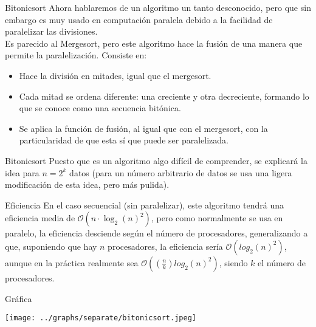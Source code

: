 \documentclass[compress]{beamer}
\begin{document}
\begin{frame}{Bitonicsort}
Ahora hablaremos de un algoritmo un tanto desconocido, pero que sin embargo es muy usado en computación paralela debido a la facilidad de paralelizar las divisiones.\\
\vspace{0.20in}
Es parecido al Mergesort, pero este algoritmo hace la fusión de una manera que permite la paralelización. Consiste en:\\
\vspace{0.20in}
	\begin{itemize}
	\item Hace la división en mitades, igual que el mergesort.
	\item Cada mitad se ordena diferente: una creciente y otra decreciente, formando lo que se conoce como una secuencia bitónica.
	\item Se aplica la función de fusión, al igual que con el mergesort, con la particularidad de que esta sí que puede ser paralelizada.
	\end{itemize}
\end{frame}

\begin{frame}{Bitonicsort}
Puesto que es un algoritmo algo difícil de comprender, se explicará la idea para $n = 2^k$ datos (para un número arbitrario de datos se usa una ligera modificación de esta idea, pero más pulida).\\
\vspace{0.20in}
	\begin{block}{Eficiencia}
	En el caso secuencial (sin paralelizar), este algoritmo tendrá una eficiencia media de $\mathcal{O}(n\cdot\log_2(n)^2)$, pero como normalmente se usa en paralelo, la eficiencia desciende según el número de procesadores, generalizando a que, suponiendo que hay $n$ procesadores, la eficiencia sería $\mathcal{O}(log_2(n)^2)$, aunque en la práctica realmente sea $\mathcal{O}((\tfrac{n}{k})log_2(n)^2)$, siendo $k$ el número de procesadores.
	\end{block}
\end{frame}

\begin{frame}{Gráfica}
	\begin{alertblock}{}
		\begin{center}
		\texttt{[image: ../graphs/separate/bitonicsort.jpeg]}
		\end{center}
	\end{alertblock}
\end{frame}
\end{document}
